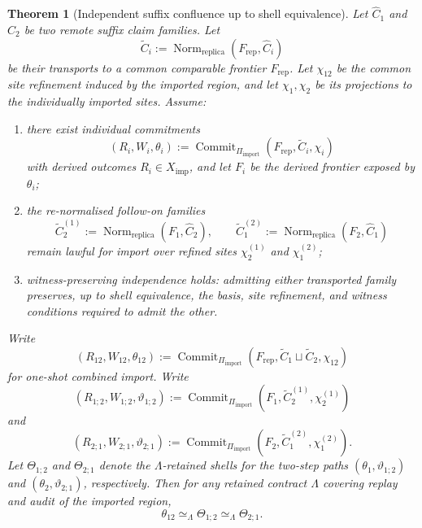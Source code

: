 \documentclass[11pt]{article}
\theoremstyle{definition}
\theoremstyle{plain}
\newtheorem{theorem}[definition]{Theorem}
\theoremstyle{remark}
\begin{document}
\begin{theorem}[Independent suffix confluence up to shell equivalence]
Let \(\widehat{C}_1\) and \(\widehat{C}_2\) be two remote suffix claim
families. Let
\[
\widetilde{C}_i
:=
\operatorname{Norm}_{\mathrm{replica}}(F_{\mathrm{rep}}, \widehat{C}_i)
\]
be their transports to a common comparable frontier \(F_{\mathrm{rep}}\). Let
\(\chi_{12}\) be the common site refinement induced by the imported region, and
let \(\chi_1,\chi_2\) be its projections to the individually imported sites.
Assume:

\begin{enumerate}[leftmargin=*]
  \item there exist individual commitments
  \[
  (R_i, W_i, \theta_i)
  :=
  \operatorname{Commit}_{\Pi_{\mathrm{import}}}
  (F_{\mathrm{rep}}, \widetilde{C}_i, \chi_i)
  \]
  with derived outcomes \(R_i \in X_{\mathrm{imp}}\), and let \(F_i\) be the
  derived frontier exposed by \(\theta_i\);

  \item the re-normalised follow-on families
  \[
  \widetilde{C}_2^{(1)}
  :=
  \operatorname{Norm}_{\mathrm{replica}}(F_1, \widehat{C}_2),
  \qquad
  \widetilde{C}_1^{(2)}
  :=
  \operatorname{Norm}_{\mathrm{replica}}(F_2, \widehat{C}_1)
  \]
  remain lawful for import over refined sites
  \(\chi_2^{(1)}\) and \(\chi_1^{(2)}\);

  \item witness-preserving independence holds: admitting either transported
  family preserves, up to shell equivalence, the basis, site refinement, and
  witness conditions required to admit the other.
\end{enumerate}

Write
\[
(R_{12}, W_{12}, \theta_{12})
:=
\operatorname{Commit}_{\Pi_{\mathrm{import}}}
(F_{\mathrm{rep}}, \widetilde{C}_1 \sqcup \widetilde{C}_2, \chi_{12})
\]
for one-shot combined import. Write
\[
(R_{1;2}, W_{1;2}, \vartheta_{1;2})
:=
\operatorname{Commit}_{\Pi_{\mathrm{import}}}
(F_1, \widetilde{C}_2^{(1)}, \chi_2^{(1)})
\]
and
\[
(R_{2;1}, W_{2;1}, \vartheta_{2;1})
:=
\operatorname{Commit}_{\Pi_{\mathrm{import}}}
(F_2, \widetilde{C}_1^{(2)}, \chi_1^{(2)}).
\]
Let \(\Theta_{1;2}\) and \(\Theta_{2;1}\) denote the \(\Lambda\)-retained shells
for the two-step paths \((\theta_1, \vartheta_{1;2})\) and
\((\theta_2, \vartheta_{2;1})\), respectively. Then for any retained contract
\(\Lambda\) covering replay and audit of the imported region,
\[
\theta_{12}
\simeq_{\Lambda}
\Theta_{1;2}
\simeq_{\Lambda}
\Theta_{2;1}.
\]
\end{theorem}
\end{document}
